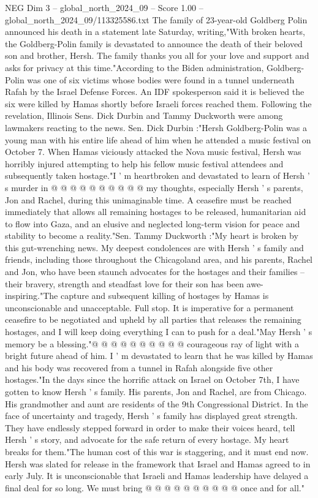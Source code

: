 \begin{textsample}{NEG Dim 3 – global\_north\_2024\_09 – Score 1.00 – global\_north\_2024\_09/113325586.txt}  \label{ex:f3_neg_299}
The family of 23-year-old Goldberg Polin announced his death in a statement late Saturday, writing,"With broken hearts, the Goldberg-Polin family is devastated to announce the death of their beloved son and brother, Hersh.
The family thanks you all for your love and support and asks for privacy at this time."According to the Biden administration, Goldberg-Polin was one of six victims whose bodies were found in a tunnel underneath Rafah by the Israel Defense Forces.
An IDF spokesperson said it is believed the six were killed by Hamas shortly before Israeli forces reached them.
Following the revelation, Illinois Sens.
Dick Durbin and Tammy Duckworth were among lawmakers reacting to the news.
Sen.
Dick Durbin :"Hersh Goldberg-Polin was a young man with his entire life ahead of him when he attended a music festival on October 7.
When Hamas viciously attacked the Nova music festival, Hersh was horribly injured attempting to help his fellow music festival attendees and subsequently taken hostage."I ' m heartbroken and devastated to learn of Hersh ' s murder in @ @ @ @ @ @ @ @ @ @ my thoughts, especially Hersh ' s parents, Jon and Rachel, during this unimaginable time.
A ceasefire must be reached immediately that allows all remaining hostages to be released, humanitarian aid to flow into Gaza, and an elusive and neglected long-term vision for peace and stability to become a reality."Sen.
Tammy Duckworth :"My heart is broken by this gut-wrenching news.
My deepest condolences are with Hersh ' s family and friends, including those throughout the Chicagoland area, and his parents, Rachel and Jon, who have been staunch advocates for the hostages and their families -- their bravery, strength and steadfast love for their son has been awe-inspiring."The capture and subsequent killing of hostages by Hamas is unconscionable and unacceptable.
Full stop.
It is imperative for a permanent ceasefire to be negotiated and upheld by all parties that releases the remaining hostages, and I will keep doing everything I can to push for a deal."May Hersh ' s memory be a blessing."@ @ @ @ @ @ @ @ @ @ courageous ray of light with a bright future ahead of him.
I ' m devastated to learn that he was killed by Hamas and his body was recovered from a tunnel in Rafah alongside five other hostages."In the days since the horrific attack on Israel on October 7th, I have gotten to know Hersh ' s family.
His parents, Jon and Rachel, are from Chicago.
His grandmother and aunt are residents of the 9th Congressional District.
In the face of uncertainty and tragedy, Hersh ' s family has displayed great strength.
They have endlessly stepped forward in order to make their voices heard, tell Hersh ' s story, and advocate for the safe return of every hostage.
My heart breaks for them."The human cost of this war is staggering, and it must end now.
Hersh was slated for release in the framework that Israel and Hamas agreed to in early July.
It is unconscionable that Israeli and Hamas leadership have delayed a final deal for so long.
We must bring @ @ @ @ @ @ @ @ @ @ once and for all."

\end{textsample}
